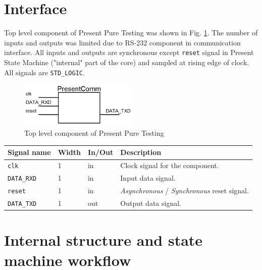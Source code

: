 \documentclass{gajewski}
\begin{document}
\newpage 

\section{Interface}

Top level component of Present Pure Testing was shown in Fig. \ref{ptest}. The number of inputs and outputs was limited due to RS-232 component in communication interface. All inputs and outputs are synchronous except \texttt{reset} signal in Present State Machine ("internal" part of the core) and sampled at rising edge of clock. All signals are \texttt{STD\_LOGIC}.
\begin{figure}[!ht]%
    \begin{center}
    \includegraphics[width=0.5\textwidth]{img/PresentPureTesting.png}
    \caption{%
        Top level component of Present Pure Testing 
     }%
    \label{ptest}
    \end{center}
 \end{figure}

\begin{tabularx}{\textwidth}{|p{30mm}|p{11mm}|p{11mm}|X|}
  \hline \bf{Signal name} & \bf{Width} & \bf{In/Out} & \bf{Description}\\ 
  \hline \texttt{clk} & 1  &  in  & Clock signal for the component. \\ 
  \hline \texttt{DATA\_RXD} & 1 & in & Input data signal. \\
  \hline \texttt{reset}	& 1  &  in  &  \emph{Asynchronous} / \emph{Synchronous} reset signal.\\ 
  \hline \texttt{DATA\_TXD} & 1 &  out  & Output data signal.	\\ 
  \hline
\end{tabularx}

\newpage

\section{Internal structure and state machine workflow}
\end{document}
